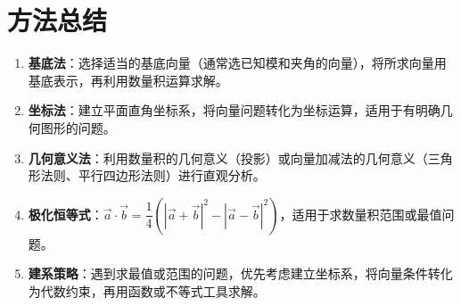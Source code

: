 \documentclass[11pt]{ctexrep}
\begin{document}
\section*{方法总结}

\begin{enumerate}
    \item \textbf{基底法}：选择适当的基底向量（通常选已知模和夹角的向量），将所求向量用基底表示，再利用数量积运算求解。
    
    \item \textbf{坐标法}：建立平面直角坐标系，将向量问题转化为坐标运算，适用于有明确几何图形的问题。
    
    \item \textbf{几何意义法}：利用数量积的几何意义（投影）或向量加减法的几何意义（三角形法则、平行四边形法则）进行直观分析。
    
    \item \textbf{极化恒等式}：$\overrightarrow{a} \cdot \overrightarrow{b} = \dfrac{1}{4}(|\overrightarrow{a}+\overrightarrow{b}|^2 - |\overrightarrow{a}-\overrightarrow{b}|^2)$，适用于求数量积范围或最值问题。
    
    \item \textbf{建系策略}：遇到求最值或范围的问题，优先考虑建立坐标系，将向量条件转化为代数约束，再用函数或不等式工具求解。
\end{enumerate}
\end{document}
